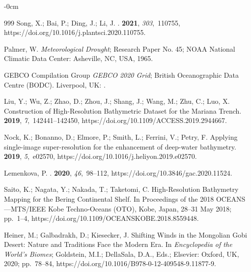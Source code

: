 \documentclass[geosciences,article,accept,pdftex,oneauthor]{Definitions/mdpi}
\begin{document}
\begin{adjustwidth}{-\extralength}{0cm}
\begin{thebibliography}{999}
Song, X.; Bai, P.; Ding, J.; Li, J.
.
 {\bf 2021}, {\em 303},~110755, https://doi.org/10.1016/j.plantsci.2020.110755.

Palmer, W.
\newblock \emph{Meteorological Drought};  Research Paper No. 45;
\newblock NOAA National Climatic Data Center: Asheville, NC, USA, 1965.

GEBCO Compilation Group
\newblock \emph{GEBCO 2020 Grid}; British Oceanographic Data Centre (BODC). Liverpool, UK: 
. 

Liu, Y.; Wu, Z.; Zhao, D.; Zhou, J.; Shang, J.; Wang, M.; Zhu, C.; Luo, X.
\newblock Construction of High-Resolution Bathymetric Dataset for the Mariana
  Trench.
 {\bf 2019}, {\em 7},~142441--142450, https://doi.org/10.1109/ACCESS.2019.2944667.

Nock, K.; Bonanno, D.; Elmore, P.; Smith, L.; Ferrini, V.; Petry, F.
\newblock Applying single-image super-resolution for the enhancement of
  deep-water bathymetry.
 {\bf 2019}, {\em 5},~e02570, https://doi.org/10.1016/j.heliyon.2019.e02570.

Lemenkova, P.
.
 {\bf 2020}, {\em 46},~98--112, https://doi.org/10.3846/gac.2020.11524.

Saito, K.; Nagata, Y.; Nakada, T.; Taketomi, C.
\newblock High-Resolution Bathymetry Mapping for the Bering Continental Shelf.
\newblock In Proceedings of the 2018 OCEANS---MTS/IEEE Kobe Techno-Oceans
  (OTO), Kobe, Japan,  28--31 May 2018; pp.~1--4, https://doi.org/10.1109/OCEANSKOBE.2018.8559448.

Heiner, M.; Galbadrakh, D.; Kiesecker, J.
\newblock Shifting Winds in the Mongolian Gobi Desert: Nature and Traditions
  Face the Modern Era. In {\em Encyclopedia of the World's Biomes}; Goldstein,
  M.I.; DellaSala, D.A., Eds.; Elsevier: Oxford, UK, 2020; pp.~78--84, https://doi.org/10.1016/B978-0-12-409548-9.11877-9.


\end{thebibliography}
\end{adjustwidth}
\end{document}
